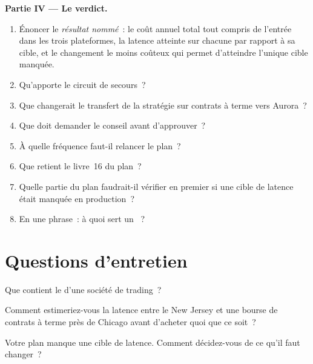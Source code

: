 \begin{problem}
\medskip\noindent\textbf{Partie IV --- Le verdict.}
\begin{enumerate}[resume]
\item Énoncer le \emph{résultat nommé}~: le coût annuel total tout compris de l'entrée dans les trois plateformes, la latence atteinte
  sur chacune par rapport à sa cible, et le changement le moins coûteux qui permet d'atteindre l'unique cible manquée.
\item Qu'apporte le circuit de secours~?
\item Que changerait le transfert de la stratégie sur contrats à terme vers Aurora~?
\item Que doit demander le conseil avant d'approuver~?
\item À quelle fréquence faut-il relancer le plan~?
\item Que retient le livre~16 du plan~?
\item Quelle partie du plan faudrait-il vérifier en premier si une cible de latence était manquée en production~?
\item En une phrase~: à quoi sert un ~?
\end{enumerate}
\end{problem}

\section{Questions d'entretien}

\begin{interviewq}\label{iq:nw:build-a-connectivity-plan:1}
Que contient le  d'une société de trading~?
\end{interviewq}

\begin{interviewq}\label{iq:nw:build-a-connectivity-plan:2}
Comment estimeriez-vous la latence entre le New Jersey et une bourse de contrats à terme près de Chicago avant d'acheter quoi que ce soit~?
\end{interviewq}

\begin{interviewq}\label{iq:nw:build-a-connectivity-plan:3}
Votre plan manque une cible de latence. Comment décidez-vous de ce qu'il faut changer~?
\end{interviewq}

